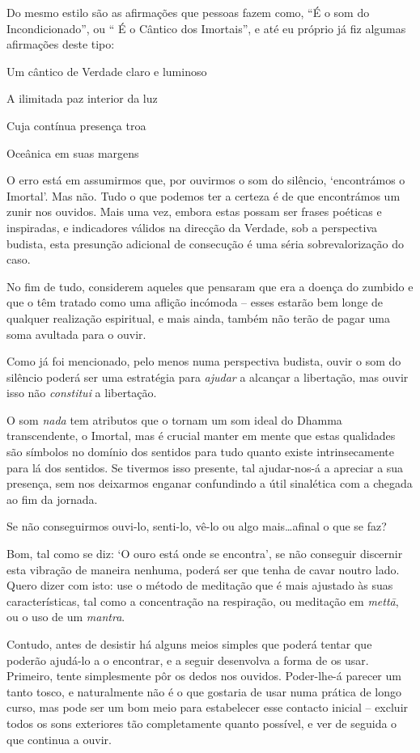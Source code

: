 Do mesmo estilo são as afirmações que pessoas fazem como, ``É o som do
Incondicionado'', ou `` É o Cântico dos Imortais'', e até eu próprio já
fiz algumas afirmações deste tipo:

Um cântico de Verdade claro e luminoso

A ilimitada paz interior da luz

Cuja contínua presença troa

Oceânica em suas margens\cite{portrait}

O erro está em assumirmos que, por ouvirmos o som do silêncio,
`encontrámos o Imortal'. Mas não. Tudo o que podemos ter a certeza é de
que encontrámos um zunir nos ouvidos. Mais uma vez, embora estas possam
ser frases poéticas e inspiradas, e indicadores válidos na direcção da
Verdade, sob a perspectiva budista, esta presunção adicional de
consecução é uma séria sobrevalorização do caso.

No fim de tudo, considerem aqueles que pensaram que era a doença do
zumbido e que o têm tratado como uma aflição incómoda -- esses estarão
bem longe de qualquer realização espiritual, e mais ainda, também não
terão de pagar uma soma avultada para o ouvir.

Como já foi mencionado, pelo menos numa perspectiva budista, ouvir o som
do silêncio poderá ser uma estratégia para \emph{ajudar} a alcançar a
libertação, mas ouvir isso não \emph{constitui} a libertação.

O som \emph{nada} tem atributos que o tornam um som ideal do Dhamma
transcendente, o Imortal, mas é crucial manter em mente que estas
qualidades são símbolos no domínio dos sentidos para tudo quanto existe
intrinsecamente para lá dos sentidos. Se tivermos isso presente, tal
ajudar-nos-á a apreciar a sua presença, sem nos deixarmos enganar
confundindo a útil sinalética com a chegada ao fim da jornada.

 Se não conseguirmos ouvi-lo, senti-lo, vê-lo ou algo
mais\ldots{}afinal o que se faz?

 Bom, tal como se diz: `O ouro está onde se encontra', se não
conseguir discernir esta vibração de maneira nenhuma, poderá ser que
tenha de cavar noutro lado. Quero dizer com isto: use o método de
meditação que é mais ajustado às suas características, tal como a
concentração na respiração, ou meditação em \emph{mettā}, ou o uso de um
\emph{mantra}.

Contudo, antes de desistir há alguns meios simples que poderá tentar que
poderão ajudá-lo a o encontrar, e a seguir desenvolva a forma de os
usar. Primeiro, tente simplesmente pôr os dedos nos ouvidos. Poder-lhe-á
parecer um tanto tosco, e naturalmente não é o que gostaria de usar numa
prática de longo curso, mas pode ser um bom meio para estabelecer esse
contacto inicial -- excluir todos os sons exteriores tão completamente
quanto possível, e ver de seguida o que continua a ouvir.

